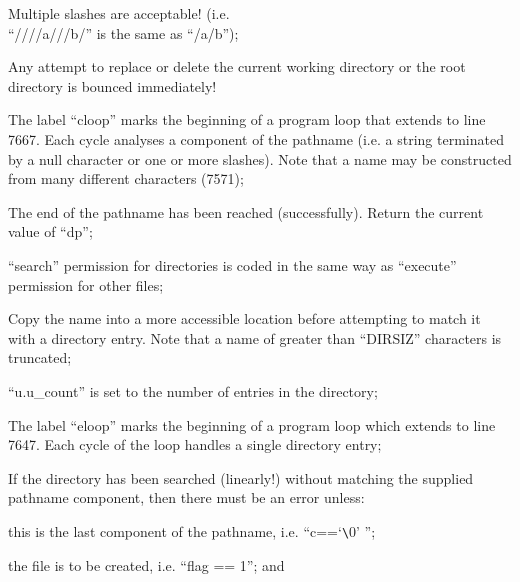 \item[7535:] Multiple slashes are  acceptable! (i.e.\\
 ``////a///b/'' is the same as ``/a/b'');

\item[7537:] Any attempt to replace or  delete
      the  current working directory or
      the  root  directory  is  bounced
      immediately!

\item[7542:] The  label  ``cloop''   marks   the
      beginning  of a program loop that
      extends to line 7667.  Each cycle
      analyses a component of the pathname (i.e. a string terminated by
      a  null  character or one or more
      slashes).  Note that a  name  may
      be  constructed  from  many  different characters (7571);

\item[7550:] The end of the pathname has  been
      reached  (successfully).   Return
      the current value of ``dp'';

\item[7563:] ``search''  permission  for  directories  is  coded in the same way
      as ``execute'' permission for other files;

\item[7570:] Copy the name into a more  accessible  location before attempting
      to  match  it  with  a  directory
      entry.    Note  that  a  name  of
      greater than ``DIRSIZ''  characters
      is truncated;

\item[7589:] ``u.u\_count'' is set to the  number
      of entries in the directory;

\item[7592:] The  label  ``eloop''   marks   the
      beginning of a program loop which
      extends to line 7647. Each cycle
      of the loop handles a single
      directory entry;

\item[7600:] If the directory has been
      searched (linearly!) without
      matching the supplied pathname
      component, then there must be an
      error unless:

\bd
     \item[(a)] this is the last component of
      the pathname, i.e. ``c==`\verb+\+0' '';

      \item[(b)] the file is to be created,
      i.e. ``flag == 1''; and

